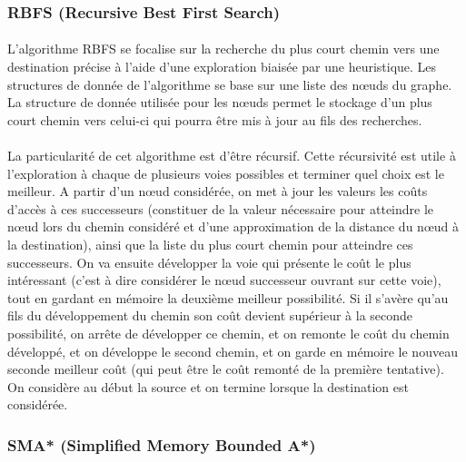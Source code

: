\documentclass[pidr]{tnreport}
\begin{document}
			\subsubsection{RBFS (Recursive Best First Search)}
\paragraph{}	
L'algorithme RBFS se focalise sur la recherche du plus court chemin vers une destination précise à l'aide d'une exploration biaisée par une heuristique. Les structures de donnée de l'algorithme se base sur une liste des nœuds du graphe. La structure de donnée utilisée pour les nœuds permet le stockage d'un plus court chemin vers celui-ci qui pourra être mis à jour au fils des recherches.

\paragraph{}	
La particularité de cet algorithme est d'être récursif. Cette récursivité est utile à l'exploration à chaque de plusieurs voies possibles et terminer quel choix est le meilleur. A partir d'un nœud considérée, on met à jour les valeurs les coûts d'accès à ces successeurs (constituer de la valeur nécessaire pour atteindre le nœud lors du chemin considéré et d'une approximation de la distance du nœud à la destination), ainsi que la liste du plus court chemin pour atteindre ces successeurs. On va ensuite développer la voie qui présente le coût le plus intéressant (c'est à dire considérer le nœud successeur ouvrant sur cette voie), tout en gardant en mémoire la deuxième meilleur possibilité. Si il s'avère qu'au fils du développement du chemin son coût devient supérieur à la seconde possibilité, on arrête de développer ce chemin, et on remonte le coût du chemin développé, et on développe le second chemin, et on garde en mémoire le nouveau seconde meilleur coût (qui peut être le coût remonté de la première tentative). On considère au début la source et on termine lorsque la destination est considérée.  
	
			\subsubsection{SMA* (Simplified Memory Bounded A*)}	
\end{document}
